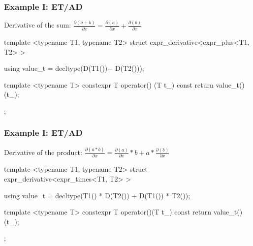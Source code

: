 \documentclass[aspectratio=43]{beamer}
\begin{document}
\begin{frame}[fragile]\frametitle{Example I: ET/AD}
  Derivative of the sum: $\frac{\partial (a+b)}{\partial x}=\frac{\partial (a)}{\partial x}+\frac{\partial (b)}{\partial x}$
  \begin{Cpplisting}{}
template <typename T1, typename T2>
struct expr_derivative<expr_plus<T1, T2> >{
    using value_t = decltype(D(T1())+ D(T2()));

    template <typename T>
    constexpr T operator() (T t_) const{
        return value_t()(t_);
    }
};
  \end{Cpplisting}
\end{frame}

\begin{frame}[fragile]\frametitle{Example I: ET/AD}
  Derivative of the product: $\frac{\partial (a*b)}{\partial x}=\frac{\partial (a)}{\partial x}*b+a*\frac{\partial (b)}{\partial x}$
  \begin{Cpplisting}{}
template <typename T1, typename T2>
struct expr_derivative<expr_times<T1, T2> >{

    using value_t = decltype(T1() * D(T2())
                             +
                             D(T1()) * T2());

    template <typename T>
    constexpr T operator()(T t_)  const{
        return value_t()(t_);
    }
};
  \end{Cpplisting}
\end{frame}


\end{document}
